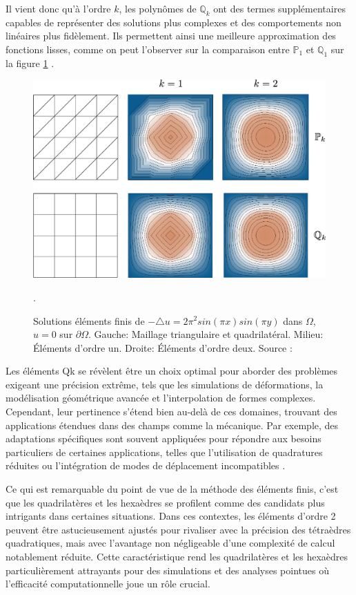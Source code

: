 Il vient donc qu'à l'ordre $k$, les polynômes de $\mathbb{Q}_k$ ont des termes supplémentaires capables de représenter des solutions plus complexes et des comportements non linéaires plus fidèlement. Ils permettent ainsi une meilleure approximation des fonctions lisses, comme on peut l'observer sur la comparaison entre $\mathbb{P}_1$ et $\mathbb{Q}_1$ sur la figure \ref{fig:p1_vs_p2} \cite{reberol2018maillages}.
\begin{figure}
    \centering
    \includegraphics[scale=0.5]{images/comparaison_P_1_P_2.png}
    \caption{Solutions éléments finis de $-\triangle u=2\pi^2sin(\pi x)sin(\pi y)$ dans $\Omega$, $u=0$ sur $\partial\Omega$. Gauche: Maillage triangulaire et quadrilatéral. Milieu: Éléments d’ordre un. Droite: Éléments d’ordre deux. Source : \cite{reberol2018maillages}}.
    \label{fig:p1_vs_p2}
\end{figure}

Les éléments Qk se révèlent être un choix optimal pour aborder des problèmes exigeant une précision extrême, tels que les simulations de déformations, la modélisation géométrique avancée et l'interpolation de formes complexes. Cependant, leur pertinence s'étend bien au-delà de ces domaines, trouvant des applications étendues dans des champs comme la mécanique. Par exemple, des adaptations spécifiques sont souvent appliquées pour répondre aux besoins particuliers de certaines applications, telles que l'utilisation de quadratures réduites ou l'intégration de modes de déplacement incompatibles \cite{reberol2018maillages}.

Ce qui est remarquable du point de vue de la méthode des éléments finis, c'est que les quadrilatères et les hexaèdres se profilent comme des candidats plus intrigants dans certaines situations. Dans ces contextes, les éléments d'ordre 2 peuvent être astucieusement ajustés pour rivaliser avec la précision des tétraèdres quadratiques, mais avec l'avantage non négligeable d'une complexité de calcul notablement réduite. Cette caractéristique rend les quadrilatères et les hexaèdres particulièrement attrayants pour des simulations et des analyses pointues où l'efficacité computationnelle joue un rôle crucial.

